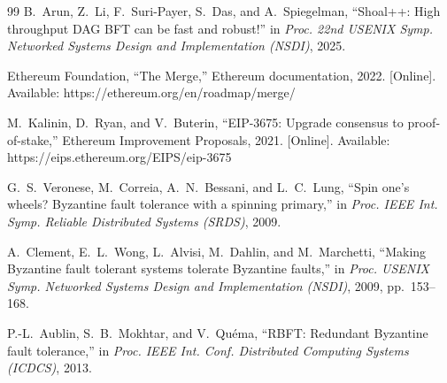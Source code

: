 \documentclass[journal]{IEEEtran}
\theoremstyle{definition}
\theoremstyle{remark}
\begin{document}
\begin{thebibliography}{99}
 B.~Arun, Z.~Li, F.~Suri-Payer, S.~Das, and A.~Spiegelman, ``Shoal++: High
throughput DAG BFT can be fast and robust!'' in \emph{Proc. 22nd USENIX Symp. Networked Systems
Design and Implementation (NSDI)}, 2025.

 Ethereum Foundation, ``The Merge,'' Ethereum documentation, 2022.
[Online]. Available: https://ethereum.org/en/roadmap/merge/

 M.~Kalinin, D.~Ryan, and V.~Buterin, ``EIP-3675: Upgrade consensus to
proof-of-stake,'' Ethereum Improvement Proposals, 2021. [Online]. Available:
https://eips.ethereum.org/EIPS/eip-3675

 G.~S.~Veronese, M.~Correia, A.~N.~Bessani, and L.~C.~Lung, ``Spin one's wheels?
Byzantine fault tolerance with a spinning primary,'' in \emph{Proc. IEEE Int. Symp. Reliable
Distributed Systems (SRDS)}, 2009.

 A.~Clement, E.~L.~Wong, L.~Alvisi, M.~Dahlin, and M.~Marchetti, ``Making
Byzantine fault tolerant systems tolerate Byzantine faults,'' in \emph{Proc. USENIX Symp.
Networked Systems Design and Implementation (NSDI)}, 2009, pp.~153--168.

 P.-L.~Aublin, S.~B.~Mokhtar, and V.~Qu\'ema, ``RBFT: Redundant Byzantine fault
tolerance,'' in \emph{Proc. IEEE Int. Conf. Distributed Computing Systems (ICDCS)}, 2013.

\end{thebibliography}
\end{document}
